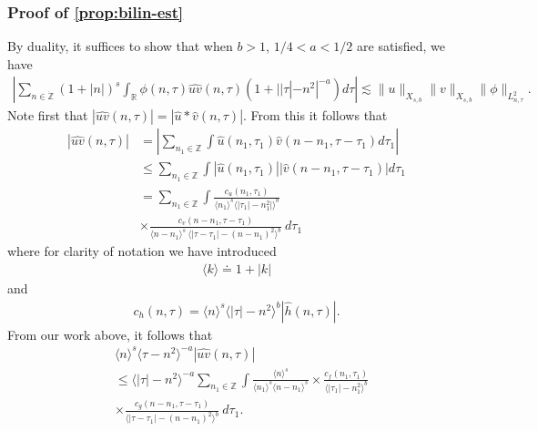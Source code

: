\documentclass[12pt,reqno]{amsart}
\numberwithin{equation}{section}  %
\numberwithin{figure}{section}
\newcommand{\rr}{\mathbb{R}}
\newcommand{\zz}{\mathbb{Z}}
\newcommand{\zzdot}{\dot{\zz}}
\newcommand{\wh}{\widehat}
\theoremstyle{plain}
\theoremstyle{definition}
\theoremstyle{remark}
\begin{document}
\subsubsection{Proof of \autoref{prop:bilin-est}} 
\label{sssec:proof-bilin-est}
By
duality, it suffices to show that when $b>1$, $1/4 < a <1/2$ are satisfied, we have
%
\begin{equation}
	\label{duality-est}
	\begin{split}
	|	\sum_{n \in \zzdot}  (1 + |n|)^{s}
		\int_{\rr} \phi(n, \tau) \wh{uv}(n, \tau)(1 
    + | |\tau| - n^{2} |^{-a}) d \tau | \lesssim \|u\|_{X_{s,b}}
    \|v\|_{X_{s,b}}
    \|\phi \|_{L^{2}_{n, \tau}}.
	\end{split}
\end{equation}
Note first that $|\wh{uv}(n, \tau) |  = | \wh{u} *  \wh{v} 
(n, \tau)|$. From this it follows that
%
%
\begin{equation}
	\label{non-lin-rep}
	\begin{split}
		| \wh{uv}(n, \tau)|
    & = | \sum_{n_{1} \in \zz }  \int
    \wh{u}\left( n_1,  \tau_1 \right) \wh{v}\left( n - n_1 , \tau - \tau_1   
\right) d \tau_1 |
\\
& \le  \sum_{n_{1} \in \zz }  \int
    |\wh{u}\left( n_1,  \tau_1 \right)| |\wh{v}\left( n - n_1 , \tau - \tau_1   
\right)| d \tau_1 
\\
& = \sum_{n_1 \in \zz } \int \frac{c_u\left( n_1, \tau_1 
\right)}{\langle n_1 \rangle ^s \langle |\tau_1| - n_1^{2} | \rangle ^{b}}
\\
& \times \frac{c_{v}\left( n - n_1, \tau - \tau_1 \right)}{\langle n -
n_1 \rangle ^s\ \langle |\tau - \tau_1 | -  (n - n_1)^{2} \rangle^{b}}
  \ d \tau_1 
\end{split}
\end{equation}
%
%
where for clarity of notation we have introduced 
%
%
%
\begin{equation*}
\begin{split}
\langle k \rangle \doteq 1 + |k|
\end{split}
\end{equation*}
%
%
and
%
\begin{equation*}
	\begin{split}
		c_h(n, \tau) =
			\langle n \rangle ^s \langle |\tau| - n^{2} \rangle ^{b} | \wh{h}\left( n, \tau \right) |.
	\end{split}
\end{equation*}
%
%
From our work above, it follows that 
%
%
\begin{equation}
	\label{convo-est-starting-pnt}
	\begin{split}
		 & \langle n \rangle^s \langle \tau - n^{2} \rangle^{-a} | \wh{uv}\left( 
		n, \tau \right) |
		\\
		& \le \langle |\tau| - n^{2} \rangle^{-a}
		\sum_{n_1 \in \zz} \int \frac{\langle n \rangle^{s}}{\langle n_1 \rangle^s
    \langle n - n_1 \rangle^s} 
		\times \frac{c_f(n_1, \tau_1)}{\langle |\tau_1| - n_1^{2} \rangle ^{b}}
		\\
		& \times
		\frac{c_g(n - n_1, \tau - \tau_1 )}{\langle |\tau - \tau_1| - (n - n_1)^{2}
    \rangle^{b}}\ d \tau_1.
	\end{split}
\end{equation}
\end{document}
